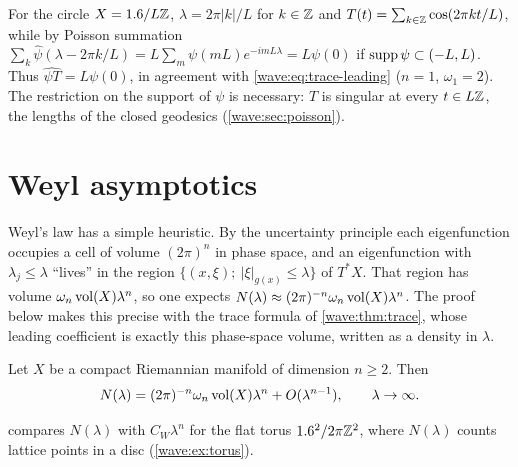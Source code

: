 \begin{remark}\label{wave:rem:circle}
For the circle $X=1.6/L\mathbb{Z}$, $\lambda=2\pi|k|/L$ for $k\in\mathbb{Z}$ and
$T(t)=\sum_{k\in\mathbb{Z}}\cos(2\pi kt/L)$, while by Poisson summation $\sum_k\hat\psi(\lambda-2\pi k/L)
=L\sum_m\psi(mL)e^{-imL\lambda}=L\psi(0)$ if $\operatorname{supp}\psi\subset(-L,L)$. Thus
$\widehat{\psi T}=L\psi(0)$, in agreement with \eqref{wave:eq:trace-leading} ($n=1$,
$\omega_1=2$). The restriction on the support of $\psi$ is necessary: $T$ is singular at every
$t\in L\mathbb{Z}$, the lengths of the closed geodesics (\cref{wave:sec:poisson}).
\end{remark}

\section{Weyl asymptotics}\label{wave:sec:weyl}

\begin{discussion}
Weyl's law has a simple heuristic. By the uncertainty principle each eigenfunction
occupies a cell of volume $(2\pi)^n$ in phase space, and an eigenfunction with
$\lambda_j\le\lambda$ ``lives'' in the region $\{(x,\xi);\ |\xi|_{g(x)}\le\lambda\}$ of
$T^*X$. That region has volume $\omega_n\operatorname{vol}(X)\lambda^n$, so one expects
$N(\lambda)\approx(2\pi)^{-n}\omega_n\operatorname{vol}(X)\lambda^n$. The proof below makes this
precise with the trace formula of \cref{wave:thm:trace}, whose leading coefficient is
exactly this phase-space volume, written as a density in $\lambda$.
\end{discussion}

\begin{theorem}\label{wave:thm:weyl}
Let $X$ be a compact Riemannian manifold of dimension $n\ge2$. Then
\begin{equation*}
N(\lambda)=(2\pi)^{-n}\omega_n\operatorname{vol}(X)\lambda^n+O(\lambda^{n-1}),\qquad\lambda\to\infty .
\end{equation*}
\end{theorem}
 compares $N(\lambda)$ with $C_W\lambda^n$ for the flat torus
$1.6^2/2\pi\mathbb{Z}^2$, where $N(\lambda)$ counts lattice points in a disc
(\cref{wave:ex:torus}).

